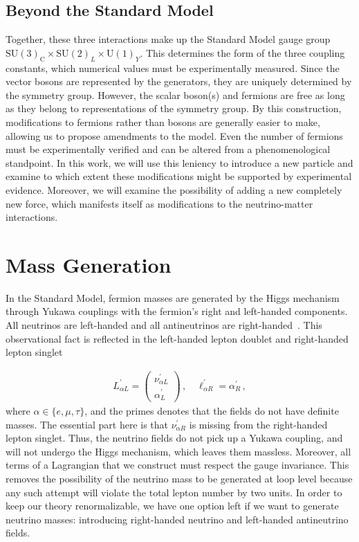 \subsection{Beyond the Standard Model}
Together, these three interactions make up the Standard Model gauge group $\mathrm{SU}(3)_{\mathrm{C}} \times \mathrm{SU}(2)_{L} \times \mathrm{U}(1)_{Y}$. 
This determines the form of the three coupling constants, which numerical values must be experimentally measured. 
Since the vector bosons are represented by the generators, they are uniquely determined by the symmetry group. However, the scalar boson(s) and fermions are free as long as they
belong to representations of the symmetry group. By this construction, modifications to fermions rather than bosons are generally easier to make, allowing us to propose amendments to the model. Even the
number of fermions must be experimentally verified and can be altered from a phenomenological standpoint. In this work,
we will use this leniency to introduce a new particle and examine to which extent 
these modifications might be supported by experimental evidence. Moreover, we will examine the possibility of adding a new completely new force, which manifests itself as modifications to the neutrino-matter interactions.

\section{Mass Generation}
In the Standard Model, fermion masses are generated by the Higgs mechanism through Yukawa couplings with the fermion's right and left-handed components.
All neutrinos are left-handed and all antineutrinos are right-handed~\cite{giunti}. This observational fact is reflected in the 
left-handed lepton doublet and right-handed lepton singlet

\begin{align}
    L^\prime_{\alpha L} = \begin{pmatrix}
            \nu^\prime_{\alpha L} \\
        \alpha^\prime_{L} 
    \end{pmatrix}\,, \quad
    \ell^\prime_{\alpha R} =
    \alpha^\prime_{R} \,,            
\end{align}
where $\alpha \in \{e,\mu,\tau\}$, and the primes denotes that the fields do not have definite masses.
The essential part here is that $\nu^\prime_{\alpha R}$ is missing from the right-handed lepton singlet.
Thus, the neutrino fields do not pick up a Yukawa coupling, 
and will not undergo the Higgs mechanism, which leaves them massless.
Moreover, all terms of a Lagrangian that we construct must respect the gauge invariance. This removes the possibility of the neutrino mass to be 
generated at loop level because any such attempt will violate the total lepton number by two units.
In order to keep our theory renormalizable, we have one option left if we want to generate neutrino masses: introducing right-handed neutrino and left-handed antineutrino fields. 

